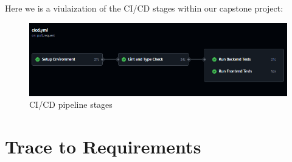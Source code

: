 \documentclass[12pt, titlepage]{article}
\begin{document}
\noindent Here we is a viulaization of the CI/CD stages within our capstone project:
\begin{figure}[ht!]
  \centering
  \includegraphics[scale=1.3]{../assets/Ci.png}
  \caption{CI/CD pipeline stages}
  \label{fig:survey6}
\end{figure}
\newpage
\section{Trace to Requirements}
\end{document}
